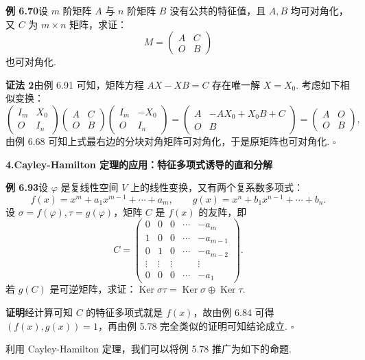 \documentclass[UTF8, 12pt, fontset=fandol, oneside]{ctexart}
\begin{document}
\noindent\textbf{例 6.70}\quad 设 $m$ 阶矩阵 $A$ 与 $n$ 阶矩阵 $B$ 没有公共的特征值，且 $A,B$ 均可对角化，又 $C$ 为 $m\times n$ 矩阵，求证：
\[
M=\begin{pmatrix} A&C\\ O&B\end{pmatrix}
\]
也可对角化.

\noindent\textbf{证法 2}\quad 由例 6.91 可知，矩阵方程 $AX-XB=C$ 存在唯一解 $X=X_0$. 考虑如下相似变换：
\[
\begin{pmatrix} I_m&X_0\\ O&I_n\end{pmatrix}
\begin{pmatrix} A&C\\ O&B\end{pmatrix}
\begin{pmatrix} I_m&-X_0\\ O&I_n\end{pmatrix}
=
\begin{pmatrix} A&-AX_0+X_0B+C\\ O&B\end{pmatrix}
=
\begin{pmatrix} A&O\\ O&B\end{pmatrix},
\]
由例 6.68 可知上式最右边的分块对角矩阵可对角化，于是原矩阵也可对角化. $\square$

\noindent\textbf{4.\quad Cayley-Hamilton 定理的应用：特征多项式诱导的直和分解}

\noindent\textbf{例 6.93}\quad 设 $\varphi$ 是复线性空间 $V$ 上的线性变换，又有两个复系数多项式：
\[
f(x)=x^m+a_1x^{m-1}+\cdots+a_m,\qquad
g(x)=x^n+b_1x^{n-1}+\cdots+b_n.
\]
设 $\sigma=f(\varphi),\tau=g(\varphi)$，矩阵 $C$ 是 $f(x)$ 的友阵，即
\[
C=
\begin{pmatrix}
0&0&0&\cdots&-a_m\\
1&0&0&\cdots&-a_{m-1}\\
0&1&0&\cdots&-a_{m-2}\\
\vdots&\vdots&\vdots&&\vdots\\
0&0&0&\cdots&-a_1
\end{pmatrix}.
\]
若 $g(C)$ 是可逆矩阵，求证：$\operatorname{Ker}\sigma\tau=\operatorname{Ker}\sigma\oplus\operatorname{Ker}\tau$.

\noindent\textbf{证明}\quad 经计算可知 $C$ 的特征多项式就是 $f(x)$，故由例 6.84 可得 $(f(x),g(x))=1$，再由例 5.78 完全类似的证明可知结论成立. $\square$

利用 Cayley-Hamilton 定理，我们可以将例 5.78 推广为如下的命题.
\end{document}
